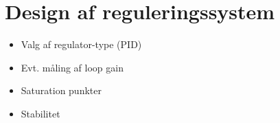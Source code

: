 \section{Design af reguleringssystem}\label{sec:sec_regdesign}
\begin{itemize}
	\item Valg af regulator-type (PID)
	\item Evt. måling af loop gain 
	\item Saturation punkter
	\item Stabilitet
\end{itemize}